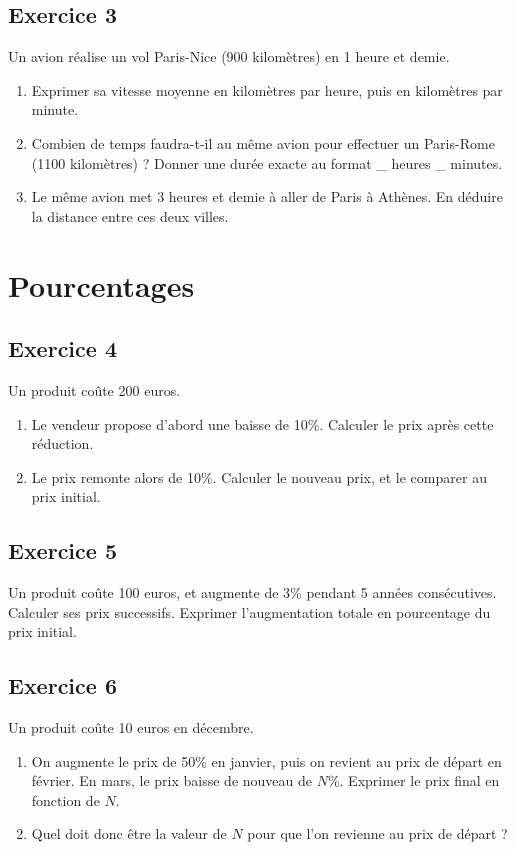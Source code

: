 \documentclass[12 pt]{extarticle}
\theoremstyle{plain}
\begin{document}
\subsection*{Exercice 3}
Un avion réalise un vol Paris-Nice (900 kilomètres) en 1 heure et demie. 
\begin{enumerate}
\item Exprimer sa vitesse moyenne en kilomètres par heure, puis en kilomètres par minute. 
\item Combien de temps faudra-t-il au même avion pour effectuer un Paris-Rome (1100 kilomètres) ? Donner une durée exacte au format \_ heures \_ minutes. 
 
 \item Le même avion met $3$ heures et demie à aller de Paris à Athènes. En déduire la distance entre ces deux villes.  
\end{enumerate}

\section{Pourcentages}
\subsection*{Exercice 4}

Un produit coûte 200 euros. 

\begin{enumerate}
\item Le vendeur propose d'abord une baisse de 10\%. Calculer le prix après cette réduction. 

\item Le prix remonte alors de 10\%. Calculer le nouveau prix, et le comparer au prix initial. 
\end{enumerate}

\subsection*{Exercice 5}

Un produit coûte 100 euros, et augmente de 3\% pendant 5 années consécutives. Calculer ses prix successifs. Exprimer l'augmentation totale en pourcentage du prix initial. 

\subsection*{Exercice 6}

Un produit coûte 10 euros en décembre.
\begin{enumerate}
\item On augmente le prix de 50\% en janvier, puis on revient au prix de départ en février. En mars, le prix baisse de nouveau de $N$\%. Exprimer le prix final en fonction de $N$.
\item Quel doit donc être la valeur de $N$ pour que l'on revienne au prix de départ ? 
\end{enumerate}
 
\end{document}
